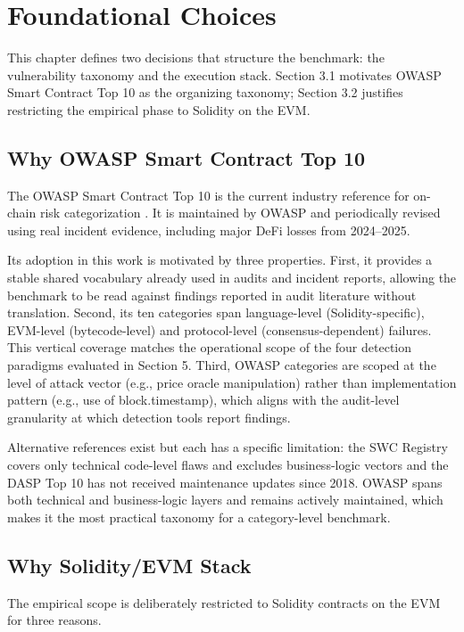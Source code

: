 \section{Foundational Choices}

This chapter defines two decisions that structure the benchmark: the vulnerability taxonomy and the execution stack. Section 3.1 motivates OWASP Smart Contract Top 10 as the organizing taxonomy; Section 3.2 justifies restricting the empirical phase to Solidity on the EVM.

\subsection{Why OWASP Smart Contract Top 10}

The OWASP Smart Contract Top 10 is the current industry reference for on-chain risk categorization \cite{owasp_top10}. It is maintained by OWASP and periodically revised using real incident evidence, including major DeFi losses from 2024--2025.

Its adoption in this work is motivated by three properties. First, it provides a stable shared vocabulary already used in audits and incident reports, allowing the benchmark to be read against findings reported in audit literature without translation. Second, its ten categories span language-level (Solidity-specific), EVM-level (bytecode-level) and protocol-level (consensus-dependent) failures. This vertical coverage matches the operational scope of the four detection paradigms evaluated in Section 5. Third, OWASP categories are scoped at the level of attack vector (e.g., price oracle manipulation) rather than implementation pattern (e.g., use of block.timestamp), which aligns with the audit-level granularity at which detection tools report findings.

Alternative references exist but each has a specific limitation: the SWC Registry covers only technical code-level flaws and excludes business-logic vectors and the DASP Top 10 has not received maintenance updates since 2018. OWASP spans both technical and business-logic layers and remains actively maintained, which makes it the most practical taxonomy for a category-level benchmark.

\subsection{Why Solidity/EVM Stack}

The empirical scope is deliberately restricted to Solidity contracts on the EVM for three reasons.

